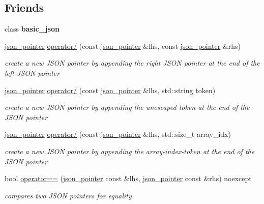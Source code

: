 \subsection*{Friends}
\begin{DoxyCompactItemize}
\item 
\mbox{\label{classnlohmann_1_1json__pointer_ada3100cdb8700566051828f1355fa745}} 
class {\bfseries basic\+\_\+json}
\item 
\hyperlink{classnlohmann_1_1json__pointer}{json\+\_\+pointer} \hyperlink{classnlohmann_1_1json__pointer_a90a11fe6c7f37b1746a3ff9cb24b0d53}{operator/} (const \hyperlink{classnlohmann_1_1json__pointer}{json\+\_\+pointer} \&lhs, const \hyperlink{classnlohmann_1_1json__pointer}{json\+\_\+pointer} \&rhs)
\begin{DoxyCompactList}\small\item\em create a new J\+S\+ON pointer by appending the right J\+S\+ON pointer at the end of the left J\+S\+ON pointer \end{DoxyCompactList}\item 
\hyperlink{classnlohmann_1_1json__pointer}{json\+\_\+pointer} \hyperlink{classnlohmann_1_1json__pointer_aa44c0583fb06a018b0cf041302f109fa}{operator/} (const \hyperlink{classnlohmann_1_1json__pointer}{json\+\_\+pointer} \&lhs, std\+::string token)
\begin{DoxyCompactList}\small\item\em create a new J\+S\+ON pointer by appending the unescaped token at the end of the J\+S\+ON pointer \end{DoxyCompactList}\item 
\hyperlink{classnlohmann_1_1json__pointer}{json\+\_\+pointer} \hyperlink{classnlohmann_1_1json__pointer_a29f6d4b492e784b9d196b05a4048c289}{operator/} (const \hyperlink{classnlohmann_1_1json__pointer}{json\+\_\+pointer} \&lhs, std\+::size\+\_\+t array\+\_\+idx)
\begin{DoxyCompactList}\small\item\em create a new J\+S\+ON pointer by appending the array-\/index-\/token at the end of the J\+S\+ON pointer \end{DoxyCompactList}\item 
bool \hyperlink{classnlohmann_1_1json__pointer_a4667ef558c8c3f8a646bfda0c6654653}{operator==} (\hyperlink{classnlohmann_1_1json__pointer}{json\+\_\+pointer} const \&lhs, \hyperlink{classnlohmann_1_1json__pointer}{json\+\_\+pointer} const \&rhs) noexcept
\begin{DoxyCompactList}\small\item\em compares two J\+S\+ON pointers for equality \end{DoxyCompactList}\item 

\end{DoxyCompactItemize}
